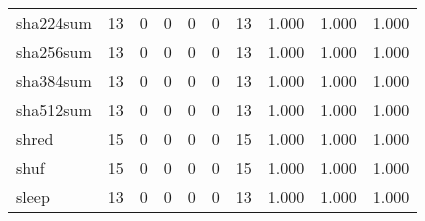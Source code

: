 \begin{longtable}{lp{2.0cm}p{2.0cm}p{2.0cm}p{2.0cm}p{2.0cm}p{2.0cm}p{2.0cm}p{2.0cm}p{2.0cm}}
sha224sum &                     13 &                                             0 &                                            0 &                                           0 &                                            0 &                                         13 &                                1.000 &                                  1.000 &                                1.000 \\
sha256sum &                     13 &                                             0 &                                            0 &                                           0 &                                            0 &                                         13 &                                1.000 &                                  1.000 &                                1.000 \\
sha384sum &                     13 &                                             0 &                                            0 &                                           0 &                                            0 &                                         13 &                                1.000 &                                  1.000 &                                1.000 \\
sha512sum &                     13 &                                             0 &                                            0 &                                           0 &                                            0 &                                         13 &                                1.000 &                                  1.000 &                                1.000 \\
shred     &                     15 &                                             0 &                                            0 &                                           0 &                                            0 &                                         15 &                                1.000 &                                  1.000 &                                1.000 \\
shuf      &                     15 &                                             0 &                                            0 &                                           0 &                                            0 &                                         15 &                                1.000 &                                  1.000 &                                1.000 \\
sleep     &                     13 &                                             0 &                                            0 &                                           0 &                                            0 &                                         13 &                                1.000 &                                  1.000 &                                1.000 \\

\end{longtable}
